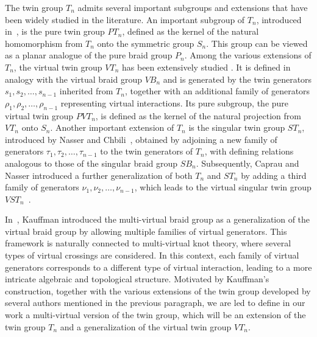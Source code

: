 \documentclass[preprint]{elsarticle}
\begin{document}
The twin group $T_n$ admits several important subgroups and extensions that have been widely studied in the literature. An important subgroup of $T_n$, introduced in~\cite{BSV}, is the pure twin group $PT_n$, defined as the kernel of the natural homomorphism from $T_n$ onto the symmetric group $S_n$. This group can be viewed as a planar analogue of the pure braid group $P_n$. Among the various extensions of $T_n$, the virtual twin group $VT_n$ has been extensively studied \cite{BSV}. It is defined in analogy with the virtual braid group $VB_n$ and is generated by the twin generators $s_1, s_2, \dots, s_{n-1}$ inherited from $T_n$, together with an additional family of generators $\rho_1, \rho_2, \dots, \rho_{n-1}$ representing virtual interactions. Its pure subgroup, the pure virtual twin group $PVT_n$, is defined as the kernel of the natural projection from $VT_n$ onto $S_n$. Another important extension of $T_n$ is the singular twin group $ST_n$, introduced by Nasser and Chbili~\cite{NasserNafaa}, obtained by adjoining a new family of generators $\tau_1, \tau_2, \ldots, \tau_{n-1}$ to the twin generators of $T_n$, with defining relations analogous to those of the singular braid group $SB_n$. Subsequently, Caprau and Nasser introduced a further generalization of both $T_n$ and $ST_n$ by adding a third family of generators $\nu_1, \nu_2, \ldots, \nu_{n-1}$, which leads to the virtual singular twin group $VST_n$~\cite{Caprau}. \vspace{0.1cm}

In~\cite{LHK2025}, Kauffman introduced the multi-virtual braid group as a generalization of the virtual braid group by allowing multiple families of virtual generators. This framework is naturally connected to multi-virtual knot theory, where several types of virtual crossings are considered. In this context, each family of virtual generators corresponds to a different type of virtual interaction, leading to a more intricate algebraic and topological structure. Motivated by Kauffman’s construction, together with the various extensions of the twin group developed by several authors mentioned in the previous paragraph, we are led to define in our work a multi-virtual version of the twin group, which will be an extension of the twin group $T_n$ and a generalization of the virtual twin group $VT_n$.\vspace{0.1cm}
\end{document}
